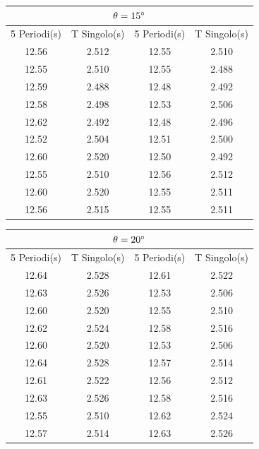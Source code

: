 \documentclass[a4paper]{article}
\begin{document}
\begin{center}
    \begin{tabular}{|c|c|c|c|}
    \hline
    \multicolumn{4}{|c|}{$\theta=15\degree$} \\
    \hline
    5 Periodi(s) & T Singolo(s) & 5 Periodi(s) & T Singolo(s) \\
    \hline
    12.56 & 2.512 & 12.55 & 2.510 \\
    12.55 & 2.510 & 12.55 & 2.488 \\
    12.59 & 2.488 & 12.48 & 2.492 \\
    12.58 & 2.498 & 12.53 & 2.506 \\
    12.62 & 2.492 & 12.48 & 2.496 \\
    12.52 & 2.504 & 12.51 & 2.500 \\
    12.60 & 2.520 & 12.50 & 2.492 \\
    12.55 & 2.510 & 12.56 & 2.512 \\
    12.60 & 2.520 & 12.55 & 2.511 \\
    12.56 & 2.515 & 12.55 & 2.511 \\
    \hline
    \end{tabular}
\end{center}

\begin{center}
    \begin{tabular}{|c|c|c|c|}
    \hline
    \multicolumn{4}{|c|}{$\theta=20\degree$} \\
    \hline
    5 Periodi(s) & T Singolo(s) & 5 Periodi(s) & T Singolo(s) \\
    \hline
    12.64 & 2.528 & 12.61 & 2.522 \\
    12.63 & 2.526 & 12.53 & 2.506 \\
    12.60 & 2.520 & 12.55 & 2.510 \\
    12.62 & 2.524 & 12.58 & 2.516 \\
    12.60 & 2.520 & 12.53 & 2.506 \\
    12.64 & 2.528 & 12.57 & 2.514 \\
    12.61 & 2.522 & 12.56 & 2.512 \\
    12.63 & 2.526 & 12.58 & 2.516 \\
    12.55 & 2.510 & 12.62 & 2.524 \\
    12.57 & 2.514 & 12.63 & 2.526 \\
    \hline
    \end{tabular}
\end{center}
\end{document}
